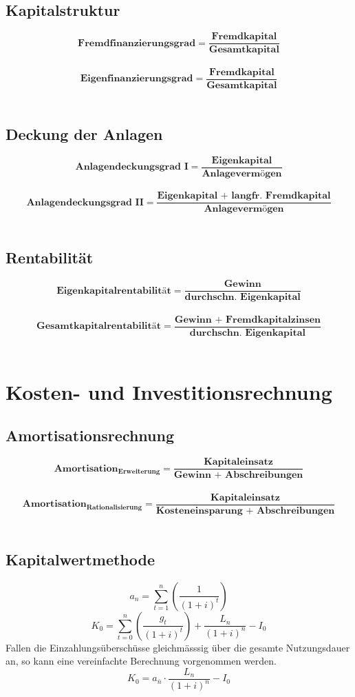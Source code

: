\section{Kapitalstruktur}
\[
		\textbf{Fremdfinanzierungsgrad}=\frac{\textbf{Fremdkapital}}{\textbf{Gesamtkapital}}
\]
\\
\[
		\textbf{Eigenfinanzierungsgrad}=\frac{\textbf{Fremdkapital}}{\textbf{Gesamtkapital}}
\]
\\
\section{Deckung der Anlagen}
\[
		\textbf{Anlagendeckungsgrad I}=\frac{\textbf{Eigenkapital}}{\textbf{Anlagevermögen}}
\]
\\
\[
		\textbf{Anlagendeckungsgrad II}=\frac{\textbf{Eigenkapital + langfr. Fremdkapital}}{\textbf{Anlagevermögen}}
\]
\\
\section{Rentabilität}
\[
		\textbf{Eigenkapitalrentabilität}=\frac{\textbf{Gewinn}}{\textbf{durchschn. Eigenkapital}}
\]
\\
\[
		\textbf{Gesamtkapitalrentabilität}=\frac{\textbf{Gewinn + Fremdkapitalzinsen}}{\textbf{durchschn. Eigenkapital}}
\]
\\
\chapter{Kosten- und Investitionsrechnung}
\section{Amortisationsrechnung}
\[
		\textbf{Amortisation}_\textbf{Erweiterung}=\frac{\textbf{Kapitaleinsatz}}{\textbf{Gewinn + Abschreibungen}}
\]
\\
\[
		\textbf{Amortisation}_\textbf{Rationalisierung}=\frac{\textbf{Kapitaleinsatz}}{\textbf{Kosteneinsparung + Abschreibungen}}
\]
\\
\section{Kapitalwertmethode}
\[
	a_n=\sum_{t=1}^{n}\left( \frac{1}{\left( 1+i\right) ^t} \right) 
\]
\[
	K_0=\sum_{t=0}^{n}\left( \frac{g_t}{\left( 1+i\right) ^t} \right) + \frac{L_n}{\left( 1+i\right) ^n}-I_0
\]
Fallen die Einzahlungsüberschüsse gleichmässsig über die gesamte Nutzungsdauer an, so kann eine vereinfachte Berechnung vorgenommen werden.\\
\[
	K_0=a_{\bar{n}}\cdot \frac{L_n}{\left( 1+i\right) ^n}-I_0
\]
\\
